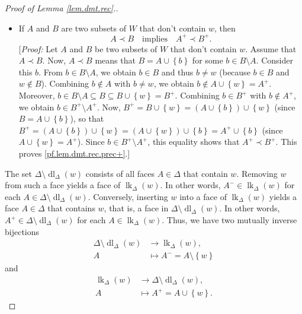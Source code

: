 \documentclass[12pt]{amsart}
\theoremstyle{definition}
\DeclareMathOperator{\lk}{lk}
\DeclareMathOperator{\dl}{dl}
\newcommand{\set}[1]{\left\{ #1 \right\}}
\newcommand{\tup}[1]{\left( #1 \right)}
\begin{document}
\begin{proof}[Proof of Lemma \ref{lem.dmt.rec}.]
\begin{itemize}
\item If $A$ and $B$ are two subsets of $W$ that don't contain $w$, then%
\begin{equation}
A\prec B \quad \text{implies} \quad A^+\prec B^+. \label{pf.lem.dmt.rec.prec+}%
\end{equation}
[\textit{Proof:} Let $A$ and $B$ be two subsets of $W$ that don't
contain $w$. Assume that $A \prec B$. Now, $A\prec B$ means that
$B = A \cup \set{b}$ for some $b\in B\setminus A$. Consider
this $b$. From $b \in B \setminus A$, we obtain $b \in B$ and thus
$b \neq w$ (because $b \in B$ and $w \notin B$).
Combining $b \notin A$ with $b \neq w$, we obtain
$b \notin A \cup \set{w} = A^+$. Moreover, $b \in B \setminus A
\subseteq B \subseteq B \cup \set{w} = B^+$.
Combining $b \in B^+$ with $b \notin A^+$, we obtain
$b \in B^+ \setminus A^+$.
Now, $B^+ = B \cup \set{w} = \tup{A \cup \set{b}} \cup \set{w}$
(since $B = A \cup \set{b}$), so that
$B^+ = \tup{A \cup \set{b}} \cup \set{w} = \tup{A \cup \set{w}}
\cup \set{b} = A^+ \cup \set{b}$
(since $A \cup \set{w} = A^+$).
Since $b \in B^+ \setminus A^+$, this equality shows that
$A^+ \prec B^+$. This proves \eqref{pf.lem.dmt.rec.prec+}.]
\end{itemize}



The set $\Delta\setminus\dl_{\Delta}\left(  w\right)
$ consists of all faces $A\in\Delta$ that contain $w$. Removing $w$ from such
a face yields a face of $\lk_{\Delta}\left(  w\right)
$. In other words, $A^-\in\lk_{\Delta}\left(
w\right)  $ for each $A\in\Delta\setminus\dl_{\Delta
}\left(  w\right)  $. Conversely, inserting $w$ into a face of
$\lk_{\Delta}\left(  w\right)  $ yields a face
$A\in\Delta$ that contains $w$, that is, a face in $\Delta\setminus
\dl_{\Delta}\left(  w\right)  $. In other words,
$A^+\in\Delta\setminus\dl_{\Delta}\left(  w\right)
$ for each $A\in\lk_{\Delta}\left(  w\right)  $. Thus,
we have two mutually inverse bijections%
\begin{align}
\Delta\setminus\dl_{\Delta}\left(  w\right)   &
\rightarrow\lk_{\Delta}\left(  w\right)  ,\nonumber\\
A  &  \mapsto A^-=A\setminus\left\{  w\right\}  \label{pf.lem.dmt.rec.bij-}%
\end{align}
and%
\begin{align}
\lk_{\Delta}\left(  w\right)   &  \rightarrow
\Delta\setminus\dl_{\Delta}\left(  w\right)
,\nonumber\\
A  &  \mapsto A^+=A\cup\left\{  w\right\}  . \label{pf.lem.dmt.rec.bij+}%
\end{align}



\end{proof}
\end{document}
